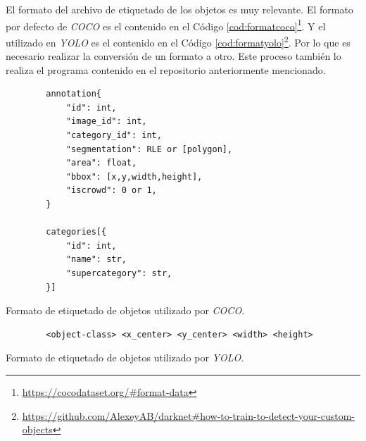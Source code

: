 El formato del archivo de etiquetado de los objetos es muy relevante. El formato por defecto de \textit{COCO} es el contenido en el Código \ref{cod:formatcoco}\footnote{\url{https://cocodataset.org/\#format-data}}. Y el utilizado en \textit{YOLO} es el contenido en el Código \ref{cod:formatyolo}\footnote{\url{https://github.com/AlexeyAB/darknet\#how-to-train-to-detect-your-custom-objects}}. Por lo que es necesario realizar la conversión de un formato a otro. Este proceso también lo realiza el programa contenido en el repositorio anteriormente mencionado.\\

\begin{code}[h]
	\begin{lstlisting}
		annotation{
			"id": int, 
			"image_id": int, 
			"category_id": int, 
			"segmentation": RLE or [polygon], 
			"area": float, 
			"bbox": [x,y,width,height], 
			"iscrowd": 0 or 1,
		}

		categories[{
			"id": int, 
			"name": str, 
			"supercategory": str,
		}]
	\end{lstlisting}
	\caption[Formato de etiquetado de objetos utilizado por \textit{COCO}.]{Formato de etiquetado de objetos utilizado por \textit{COCO}.}
	\label{cod:formatcoco}
\end{code}

\begin{code}[h]
	\begin{lstlisting}
		<object-class> <x_center> <y_center> <width> <height>
	\end{lstlisting}
	\caption[Formato de etiquetado de objetos utilizado por \textit{YOLO}.]{Formato de etiquetado de objetos utilizado por \textit{YOLO}.}
	\label{cod:formatyolo}
\end{code}

